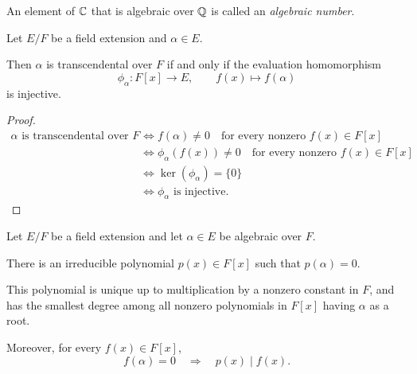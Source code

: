 \documentclass[main.tex]{subfiles}
\begin{document}
An element of $\mathbb{C}$ that is algebraic over $\mathbb{Q}$ is called an
\emph{algebraic number}.



\begin{theorem}
Let $E/F$ be a field extension and $\alpha\in E$.

Then $\alpha$ is transcendental over $F$ if and only if the
evaluation homomorphism
\[
\phi_\alpha:F[x]\longrightarrow E,
\qquad f(x)\longmapsto f(\alpha)
\]
is injective.
\end{theorem}


\begin{proof}
\[
\begin{aligned}
\alpha\text{ is transcendental over }F
&\iff f(\alpha)\ne0
\quad\text{for every nonzero }f(x)\in F[x]\\
&\iff \phi_\alpha(f(x))\ne0
\quad\text{for every nonzero }f(x)\in F[x]\\
&\iff \ker(\phi_\alpha)=\{0\}\\
&\iff \phi_\alpha\text{ is injective}.
\end{aligned}
\]
\end{proof}



\begin{theorem}
Let $E/F$ be a field extension and let $\alpha\in E$ be
algebraic over $F$.

There is an irreducible polynomial $p(x)\in F[x]$ such that
$p(\alpha)=0$.

This polynomial is unique up to multiplication by a nonzero
constant in $F$, and has the smallest degree among all nonzero
polynomials in $F[x]$ having $\alpha$ as a root.

Moreover, for every $f(x)\in F[x]$,
\[
f(\alpha)=0\quad\Longrightarrow\quad p(x)\mid f(x).
\]
\end{theorem}
\end{document}
